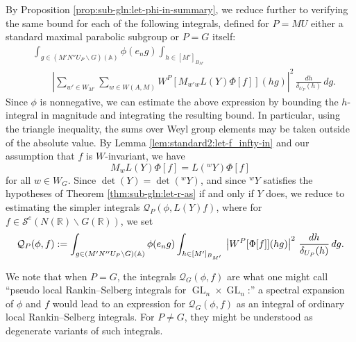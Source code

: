 \documentclass[reqno]{amsart}
\DeclareMathOperator{\GL}{GL}
\theoremstyle{plain} \newtheorem{theorem} {Theorem}
\theoremstyle{definition} \newtheorem{definition} [theorem] {Definition}
\theoremstyle{itplain} %
\numberwithin{equation}{section}
\numberwithin{theorem}{section}
\begin{document}
By Proposition \ref{prop:sub-gln:let-phi-in-summary}, we reduce further to verifying the same bound for each of the following integrals, defined for $P = MU$ either a standard maximal parabolic subgroup or $P = G$ itself:
\begin{align*}
  &\int _{g \in (M' N'' {U_P} \backslash G)(\mathbb{A}) } \phi(e_n g)
    \int _{h \in [M']_{B_{M'}}} \\
  &\quad  \quad 
  \left\lvert
    \sum _{w' \in W_{M'}}
  \sum _{w \in W(A,M)}
    W^P[M_{w' w} L(Y) \Phi[f]](h g)
  \right\rvert^2
  \, \frac{d h}{\delta_{U_P}(h)}
  \, d g.
\end{align*}
Since $\phi$ is nonnegative, we can estimate the above expression by bounding the $h$-integral in magnitude and integrating the resulting bound.  In particular, using the triangle inequality, the sums over Weyl group elements may be taken outside of the absolute value.  By Lemma \ref{lem:standard2:let-f_infty-in} and our assumption that $f$ is $W$-invariant, we have
\begin{equation*}
M_{w} L(Y) \Phi[f] = L({}^w Y) \Phi[f]
\end{equation*}
for all $w \in W_G$.  Since $\det(Y) = \det({}^w Y)$, and since ${}^w Y$ satisfies the hypotheses of Theorem \ref{thm:sub-gln:let-r-as} if and only if $Y$ does, we reduce to estimating the simpler integrals $\mathcal{Q}_P(\phi, L(Y) f)$, where for $f \in \mathcal{S}^e(N(\mathbb{R}) \backslash G(\mathbb{R}))$, we set
\begin{equation}\label{eq:mathcalq_pphi-f-:=}
  \mathcal{Q}_P(\phi, f)
  :=
  \int _{g \in (M' N'' {U_P} \backslash G)(\mathbb{A}) } \phi(e_n g)
    \int _{h \in [M']_{B_{M'}}} \\
  \left\lvert
    W^P[\Phi[f]](h g)
  \right\rvert^2
  \, \frac{d h}{\delta_{U_P}(h)}
  \, d g.
\end{equation}

We note that when $P = G$, the integrals $\mathcal{Q}_G(\phi,f)$ are what one might call ``pseudo local Rankin--Selberg integrals for $\GL_n \times \GL_n$:'' a spectral expansion of $\phi$ and $f$ would lead to an expression for $\mathcal{Q}_G(\phi,f)$ as an integral of ordinary local Rankin--Selberg integrals.  For $P \neq G$, they might be understood as degenerate variants of such integrals.
\end{document}
